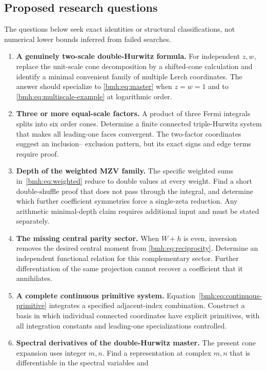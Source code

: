\subsection{Proposed research questions}
The questions below seek exact identities or structural classifications,
not numerical lower bounds inferred from failed searches.
\begin{enumerate}[label=\textbf{Q\arabic*.},leftmargin=2.8em,itemsep=7pt]
\item \textbf{A genuinely two-scale double-Hurwitz formula.}
For independent $z,w$, replace the unit-scale cone decomposition by a
shifted-cone calculation and identify a minimal convenient family of
multiple Lerch coordinates. The answer should specialize to
\eqref{bmh:eq:master} when $z=w=1$ and to
\eqref{bmh:eq:multiscale-example} at logarithmic order.
\item \textbf{Three or more equal-scale factors.}
A product of three Fermi integrals splits into six order cones. Determine
a finite connected triple-Hurwitz system that makes all leading-one
faces convergent. The two-factor coordinates suggest an inclusion--
exclusion pattern, but its exact signs and edge terms require proof.
\item \textbf{Depth of the weighted MZV family.}
The specific weighted sums in~\eqref{bmh:eq:weighted} reduce to double
values at every weight. Find a short double-shuffle proof that does not
pass through the integral, and determine which further coefficient
symmetries force a single-zeta reduction. Any arithmetic minimal-depth
claim requires additional input and must be stated separately.
\item \textbf{The missing central parity sector.}
When $W+h$ is even, inversion removes the desired central moment from
\eqref{bmh:eq:reciprocity}. Determine an independent functional relation
for this complementary sector. Further differentiation of the same
projection cannot recover a coefficient that it annihilates.
\item \textbf{A complete continuous primitive system.}
Equation~\eqref{bmh:eq:continuous-primitive} integrates a specified
adjacent-index combination. Construct a basis in which individual
connected coordinates have explicit primitives, with all integration
constants and leading-one specializations controlled.
\item \textbf{Spectral derivatives of the double-Hurwitz master.}
The present cone expansion uses integer $m,n$. Find a representation at
complex $m,n$ that is differentiable in the spectral variables and

\end{enumerate}

